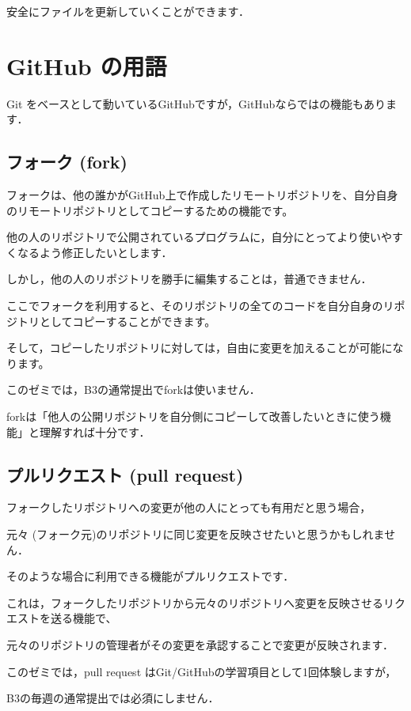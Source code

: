 安全にファイルを更新していくことができます．



\section{GitHub の用語}

Git をベースとして動いているGitHubですが，GitHubならではの機能もあります．


\subsection{フォーク (fork)}

フォークは、他の誰かがGitHub上で作成したリモートリポジトリを、自分自身のリモートリポジトリとしてコピーするための機能です。

他の人のリポジトリで公開されているプログラムに，自分にとってより使いやすくなるよう修正したいとします．

しかし，他の人のリポジトリを勝手に編集することは，普通できません．

ここでフォークを利用すると、そのリポジトリの全てのコードを自分自身のリポジトリとしてコピーすることができます。

そして，コピーしたリポジトリに対しては，自由に変更を加えることが可能になります。

このゼミでは，B3の通常提出でforkは使いません．

forkは「他人の公開リポジトリを自分側にコピーして改善したいときに使う機能」と理解すれば十分です．


\subsection{プルリクエスト (pull request)}

フォークしたリポジトリへの変更が他の人にとっても有用だと思う場合，

元々 (フォーク元)のリポジトリに同じ変更を反映させたいと思うかもしれません．

そのような場合に利用できる機能がプルリクエストです．


これは，フォークしたリポジトリから元々のリポジトリへ変更を反映させるリクエストを送る機能で、

元々のリポジトリの管理者がその変更を承認することで変更が反映されます．

このゼミでは，pull request はGit/GitHubの学習項目として1回体験しますが，

B3の毎週の通常提出では必須にしません．



